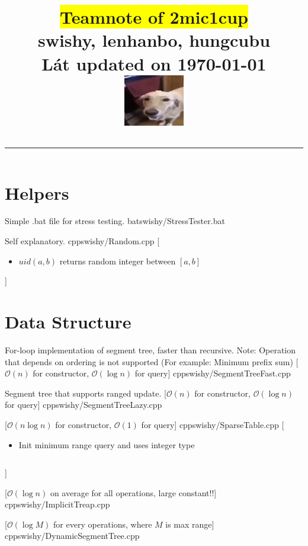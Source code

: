 \documentclass[10pt,a4paper,oneside,twocolumn]{article}
\title{
    \colorbox{yellow}{\textbf{Teamnote of 2mic1cup}} \\ \vspace{1em}
    \large swishy, lenhanbo, hungcubu \\ \vspace{1em}
    \large Lát updated on \today \\ \vspace{1em}
    \includegraphics[width=0.2\textwidth]{buttadog.png} \vspace{1em}
    \hrule 
}
\date{}
\newcommand{\currentsectiontitle}{}
\newcommand{\msection}[1]{\section{#1}\gdef\currentsectiontitle{#1}}
\begin{document}
\maketitle
\tableofcontents
\newpage


\msection{Helpers}

{Simple .bat file for stress testing.}
{bat}{swishy/StressTester.bat}

{Self explanatory.}
{cpp}{swishy/Random.cpp}
[
\begin{itemize} 
    \item {$uid(a, b)$ returns random integer between $[a, b]$}
\end{itemize}
]

\msection{Data Structure}
{For-loop implementation of segment tree, faster than recursive. Note: Operation that depends on ordering is not supported (For example: Minimum prefix sum)}
[$\mathcal{O}(n)$ for constructor, $\mathcal{O}(\log n)$ for query]
{cpp}{swishy/SegmentTreeFast.cpp}

{Segment tree that supports ranged update.}
[$\mathcal{O}(n)$ for constructor, $\mathcal{O}(\log n)$ for query]
{cpp}{swishy/SegmentTreeLazy.cpp}

[$\mathcal{O}(n\log n)$ for constructor, $\mathcal{O}(1)$ for query]
{cpp}{swishy/SparseTable.cpp}
[
    \begin{itemize}
        \item Init minimum range query and uses integer type \inputminted{cpp}{swishy/examples/SparseTable.cpp}
    \end{itemize}
]

[$\mathcal{O}(\log n)$ on average for all operations, large constant!!]
{cpp}{swishy/ImplicitTreap.cpp}

[$\mathcal{O}(\log M)$ for every operations, where $M$ is max range]
{cpp}{swishy/DynamicSegmentTree.cpp}
\end{document}
